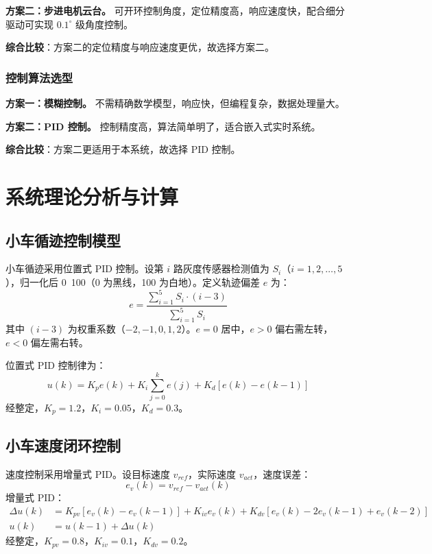 \documentclass[zihao=-4,fontset=none]{ctexart}
\begin{document}
\textbf{方案二：步进电机云台。} 可开环控制角度，定位精度高，响应速度快，配合细分驱动可实现 $0.1^\circ$ 级角度控制。

\textbf{综合比较}：方案二的定位精度与响应速度更优，故选择方案二。

\subsubsection{控制算法选型}
\textbf{方案一：模糊控制。} 不需精确数学模型，响应快，但编程复杂，数据处理量大。

\textbf{方案二：PID 控制。} 控制精度高，算法简单明了，适合嵌入式实时系统。

\textbf{综合比较}：方案二更适用于本系统，故选择 PID 控制。

\section{系统理论分析与计算}

\subsection{小车循迹控制模型}
小车循迹采用位置式 PID 控制。设第 $i$ 路灰度传感器检测值为 $S_i$（$i=1,2,\dots,5$），归一化后 0~100（0 为黑线，100 为白地）。定义轨迹偏差 $e$ 为：
\begin{equation}
    e = \frac{\sum_{i=1}^{5} S_i \cdot (i-3)}{\sum_{i=1}^{5} S_i}
\end{equation}
其中 $(i-3)$ 为权重系数（$-2,-1,0,1,2$）。$e=0$ 居中，$e>0$ 偏右需左转，$e<0$ 偏左需右转。

位置式 PID 控制律为：
\begin{equation}
    u(k) = K_p e(k) + K_i \sum_{j=0}^{k} e(j) + K_d [e(k) - e(k-1)]
\end{equation}
经整定，$K_p=1.2$，$K_i=0.05$，$K_d=0.3$。

\subsection{小车速度闭环控制}
速度控制采用增量式 PID。设目标速度 $v_{ref}$，实际速度 $v_{act}$，速度误差：
\begin{equation}
    e_v(k) = v_{ref} - v_{act}(k)
\end{equation}
增量式 PID：
\begin{align}
    \Delta u(k) &= K_{pv}[e_v(k) - e_v(k-1)] + K_{iv} e_v(k) + K_{dv}[e_v(k) - 2e_v(k-1) + e_v(k-2)] \\
    u(k) &= u(k-1) + \Delta u(k)
\end{align}
经整定，$K_{pv}=0.8$，$K_{iv}=0.1$，$K_{dv}=0.2$。
\end{document}
